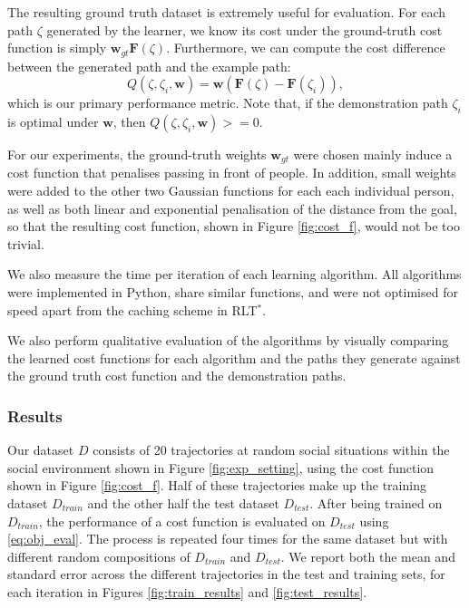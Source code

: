\documentclass[a4paper,11pt]{report}
\begin{document}
	The resulting ground truth dataset is extremely useful for evaluation. For each path $\zeta$ generated by the learner, we know its cost under the ground-truth cost function is simply  $\mathbf{w}_{gt}\mathbf{F}(\zeta)$. Furthermore, we can compute the cost difference between the generated path and the example path:
	\begin{equation}
		Q(\zeta,\zeta_i,\mathbf{w}) = \mathbf{w}(\mathbf{F}(\zeta)-\mathbf{F}(\zeta_i)), \label{eq:obj_eval}
	\end{equation}
which is our primary performance metric.  Note that, if the demonstration path $\zeta_i$ is optimal under $\mathbf{w}$, then $Q(\zeta,\zeta_i,\mathbf{w})>=0$.

For our experiments, the ground-truth weights $\mathbf{w}_{gt}$ were chosen mainly induce a cost function that penalises passing in front of people. In addition, small weights were added to the other two Gaussian functions for each each individual person, as well as both linear and exponential penalisation of the distance from the goal, so that the resulting cost function, shown in Figure \ref{fig:cost_f}, would not be too trivial. 

We also measure the time per iteration of each learning algorithm.  All algorithms were implemented in Python, share similar functions, and were not optimised for speed apart from the caching scheme in RLT$^*$.

	We also perform qualitative evaluation of the algorithms by visually comparing the learned cost functions for each algorithm and the paths they generate against the ground truth cost function and the demonstration paths.

	\subsubsection{Results}

	Our dataset $D$ consists of 20 trajectories at random social situations within the social environment shown in Figure \ref{fig:exp_setting}, using the cost function shown in Figure \ref{fig:cost_f}. Half of these trajectories make up the training dataset $D_{train}$ and the other half the test dataset $D_{test}$. After being trained on $D_{train}$, the performance of a cost function is evaluated on $D_{test}$ using \eqref{eq:obj_eval}. The process is repeated four times for the same dataset but with different random compositions of $D_{train}$ and $D_{test}$. We report both the mean and standard error across the different trajectories in the test and training sets, for each iteration in Figures \ref{fig:train_results} and \ref{fig:test_results}. 
\end{document}
